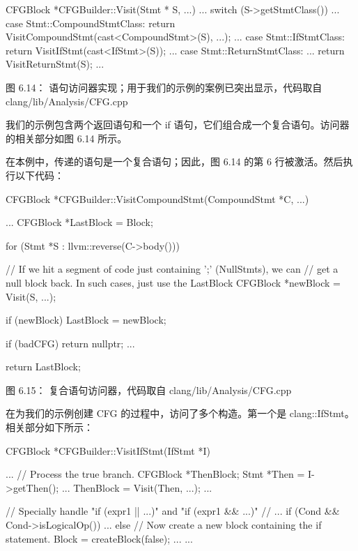 \begin{cpp}
CFGBlock *CFGBuilder::Visit(Stmt * S, ...) {
  ...
  switch (S->getStmtClass()) {
  ...
  case Stmt::CompoundStmtClass:
  return VisitCompoundStmt(cast<CompoundStmt>(S), ...);
  ...
  case Stmt::IfStmtClass:
  return VisitIfStmt(cast<IfStmt>(S));
  ...
  case Stmt::ReturnStmtClass:
  ...
  return VisitReturnStmt(S);
  ...
  }
}
\end{cpp}


\begin{center}
图 6.14： 语句访问器实现；用于我们的示例的案例已突出显示，代码取自 clang/lib/Analysis/CFG.cpp
\end{center}

我们的示例包含两个返回语句和一个 if 语句，它们组合成一个复合语句。访问器的相关部分如图 6.14 所示。

在本例中，传递的语句是一个复合语句；因此，图 6.14 的第 6 行被激活。然后执行以下代码：

\begin{cpp}
CFGBlock *CFGBuilder::VisitCompoundStmt(CompoundStmt *C, ...) {
  ...
  CFGBlock *LastBlock = Block;

  for (Stmt *S : llvm::reverse(C->body())) {
    // If we hit a segment of code just containing ';' (NullStmts), we can
    // get a null block back.  In such cases, just use the LastBlock
    CFGBlock *newBlock = Visit(S, ...);

    if (newBlock)
      LastBlock = newBlock;

    if (badCFG)
      return nullptr;
    ...
  }

  return LastBlock;
}
\end{cpp}


\begin{center}
图 6.15： 复合语句访问器，代码取自 clang/lib/Analysis/CFG.cpp
\end{center}

在为我们的示例创建 CFG 的过程中，访问了多个构造。第一个是 clang::IfStmt。相关部分如下所示：

\begin{cpp}
CFGBlock *CFGBuilder::VisitIfStmt(IfStmt *I) {
  ...
  // Process the true branch.
  CFGBlock *ThenBlock;
  {
    Stmt *Then = I->getThen();
    ...
    ThenBlock = Visit(Then, ...);
    ...
  }

  // Specially handle "if (expr1 || ...)" and "if (expr1 && ...)"
  // ...
  if (Cond && Cond->isLogicalOp())
    ...
  else {
    // Now create a new block containing the if statement.
    Block = createBlock(false);
    ...
  }
  ...
}
\end{cpp}


